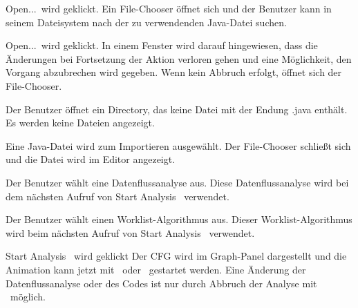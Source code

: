 

{\glqq Open...\grqq\ wird geklickt.}
{Ein File-Chooser öffnet sich und der Benutzer kann in seinem Dateisystem nach der zu verwendenden Java-Datei suchen.}

{\glqq Open...\grqq\ wird geklickt.}
{In einem Fenster wird darauf hingewiesen, dass die Änderungen bei Fortsetzung der Aktion verloren gehen und eine Möglichkeit, den Vorgang abzubrechen wird gegeben. Wenn kein Abbruch erfolgt, öffnet sich der File-Chooser.}

{Der Benutzer öffnet ein Directory, das keine Datei mit der Endung .java enthält.}
{Es werden keine Dateien angezeigt.}

{Eine Java-Datei wird zum Importieren ausgewählt.}
{Der File-Chooser schließt sich und die Datei wird im Editor angezeigt.}



{Der Benutzer wählt eine Datenflussanalyse aus.}
{Diese Datenflussanalyse wird bei dem nächsten Aufruf von \glqq Start Analysis \grqq\ verwendet.}

{Der Benutzer wählt einen Worklist-Algorithmus aus.}
{Dieser Worklist-Algorithmus wird beim nächsten Aufruf von \glqq Start Analysis \grqq\ verwendet.}



{\glqq Start Analysis \grqq\ wird geklickt}
{Der CFG wird im Graph-Panel dargestellt und die Animation kann jetzt mit \faStepForward\ oder \faPlay\ gestartet werden. Eine Änderung der Datenflussanalyse oder des Codes ist nur durch Abbruch der Analyse mit \faStop\  möglich.}

